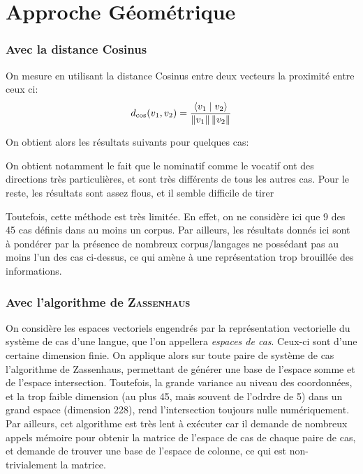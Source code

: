 \documentclass{cours}
\begin{document}
    \part{Approche Géométrique}

    \section{Avec la distance Cosinus}
    On mesure en utilisant la distance Cosinus entre deux vecteurs la proximité entre ceux ci:
    \begin{equation}
        d_{\cos}(v_{1},v_{2}) = \frac{\left\langle v_{1}\mid v_{2} \right\rangle}{\left\lVert v_{1} \right\rVert\left\lVert v_{2} \right\rVert}
    \end{equation}

    On obtient alors les résultats suivants pour quelques cas:

    

    

    

    On obtient notamment le fait que le nominatif comme le vocatif ont des directions très particulières, et sont très différents de tous les autres cas. Pour le reste, les résultats sont assez flous, et il semble difficile de tirer

    Toutefois, cette méthode est très limitée. En effet, on ne considère ici que 9 des 45 cas définis dans au moins un corpus. Par ailleurs, les résultats donnés ici sont à pondérer par la présence de nombreux corpus/langages ne possédant pas au moins l'un des cas ci-dessus, ce qui amène à une représentation trop brouillée des informations.


    \section{Avec l'algorithme de \textsc{Zassenhaus}}
    On considère les espaces vectoriels engendrés par la représentation vectorielle du système de cas d'une langue, que l'on appellera \textit{espaces de cas}.
    Ceux-ci sont d'une certaine dimension finie.
    On applique alors sur toute paire de système de cas l'algorithme de Zassenhaus, permettant de générer une base de l'espace somme et de l'espace intersection.
    Toutefois, la grande variance au niveau des coordonnées, et la trop faible dimension (au plus 45, mais souvent de l'odrdre de 5) dans un grand espace (dimension 228), rend l'intersection toujours nulle numériquement.
    Par ailleurs, cet algorithme est très lent à exécuter car il demande de nombreux appels mémoire pour obtenir la matrice de l'espace de cas de chaque paire de cas, et demande de trouver une base de l'espace de colonne, ce qui est non-trivialement la matrice.
\end{document}

